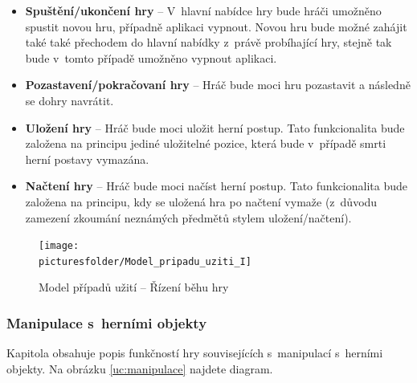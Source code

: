 \documentclass[12pt,a4paper]{article}
\def\picturesfolder{obrazky}
\begin{document}
\begin {itemize}
\item{\textbf{Spuštění/ukončení hry} --  V~hlavní nabídce hry bude hráči
  umožněno spustit novou hru, případně aplikaci vypnout. Novou hru bude možné
  zahájit také také přechodem do hlavní nabídky z~právě probíhající hry, stejně
  tak bude v~tomto případě umožněno vypnout aplikaci.}
\item{\textbf{Pozastavení/pokračovaní hry} --  Hráč bude moci hru pozastavit a
  následně se dohry navrátit.}
\item{\textbf{Uložení hry} --  Hráč bude moci uložit herní postup. Tato
  funkcionalita bude založena na principu jediné uložitelné pozice, která bude
v~případě smrti herní postavy vymazána.}
\item{\textbf{Načtení hry} --  Hráč bude moci načíst herní postup. Tato
  funkcionalita bude založena na principu, kdy se uložená hra po načtení vymaže
  (z~důvodu zamezení zkoumání neznámých předmětů stylem uložení/načtení).}
\end {itemize}

\begin{figure}
\begin{center}
  \texttt{[image: \\picturesfolder/Model\_pripadu\_uziti\_I]}
  \caption{Model případů užití -- Řízení běhu hry}
  \label{uc:rizenibehu}
\end{center}
\end{figure}

\subsubsection{Manipulace s~herními objekty}

Kapitola obsahuje popis funkčností hry souvisejících s~manipulací s~herními
objekty. Na obrázku \ref{uc:manipulace} najdete diagram.
\end{document}
